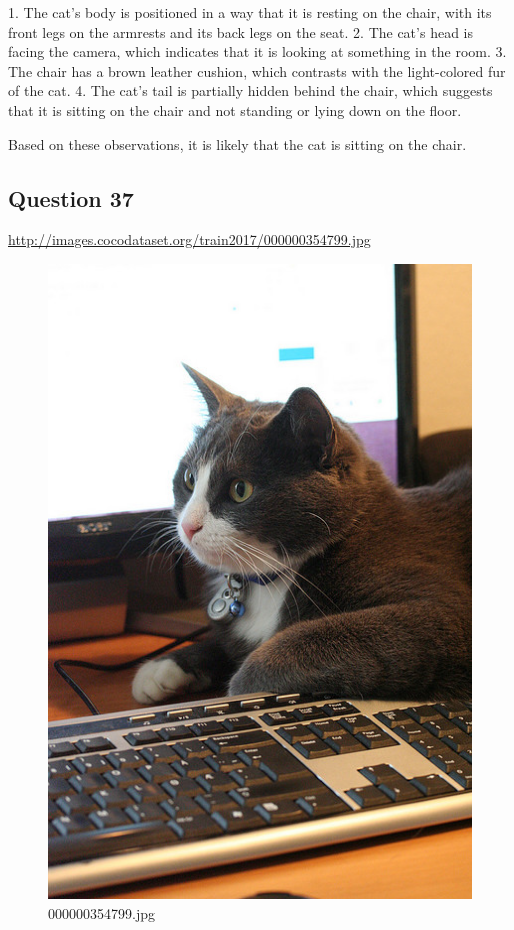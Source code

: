 \begin{enumerate}
        1. The cat’s body is positioned in a way that it is resting on the chair, with its front legs on the armrests and its back legs on the seat.
        2. The cat’s head is facing the camera, which indicates that it is looking at something in the room.
        3. The chair has a brown leather cushion, which contrasts with the light-colored fur of the cat.
        4. The cat’s tail is partially hidden behind the chair, which suggests that it is sitting on the chair and not standing or lying down on the floor.
        
        Based on these observations, it is likely that the cat is sitting on the chair.
    \end{enumerate}
\subsection*{Question 37}
\url{http://images.cocodataset.org/train2017/000000354799.jpg}
    \begin{figure}[h]
        \centering
        \includegraphics[width=0.8\linewidth]{../image set/easy/000000354799.jpg}
        \caption{000000354799.jpg}
    \end{figure}
